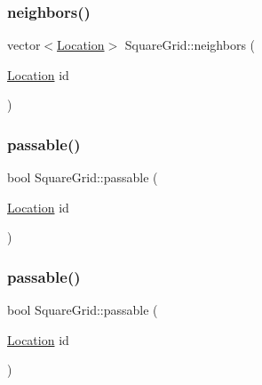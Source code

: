 \mbox{\label{structSquareGrid_a106d76702d8c4acb03883c477db28e3a}} 
\subsubsection{\texorpdfstring{neighbors()}{neighbors()}\hspace{0.1cm}{\footnotesize\ttfamily [2/2]}}
{\footnotesize\ttfamily vector$<$\mbox{\hyperlink{structSquareGrid_a2c9a2cbd3912aa48ac97289abc3f1c0f}{Location}}$>$ Square\+Grid\+::neighbors (\begin{DoxyParamCaption}\item[{\mbox{\hyperlink{structSquareGrid_a2c9a2cbd3912aa48ac97289abc3f1c0f}{Location}}}]{id }\end{DoxyParamCaption})\hspace{0.3cm}{\ttfamily [inline]}}

\mbox{\label{structSquareGrid_a3f638b46510dd880823b1acac75c7b96}} 
\subsubsection{\texorpdfstring{passable()}{passable()}\hspace{0.1cm}{\footnotesize\ttfamily [1/2]}}
{\footnotesize\ttfamily bool Square\+Grid\+::passable (\begin{DoxyParamCaption}\item[{\mbox{\hyperlink{structSquareGrid_a2c9a2cbd3912aa48ac97289abc3f1c0f}{Location}}}]{id }\end{DoxyParamCaption})\hspace{0.3cm}{\ttfamily [inline]}}

\mbox{\label{structSquareGrid_a3f638b46510dd880823b1acac75c7b96}} 
\subsubsection{\texorpdfstring{passable()}{passable()}\hspace{0.1cm}{\footnotesize\ttfamily [2/2]}}
{\footnotesize\ttfamily bool Square\+Grid\+::passable (\begin{DoxyParamCaption}\item[{\mbox{\hyperlink{structSquareGrid_a2c9a2cbd3912aa48ac97289abc3f1c0f}{Location}}}]{id }\end{DoxyParamCaption})\hspace{0.3cm}{\ttfamily [inline]}}




